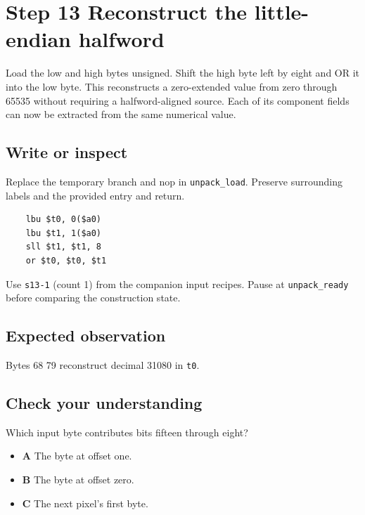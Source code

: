 \section{Step 13 Reconstruct the little-endian halfword}\label{rgb-s13}

Load the low and high bytes unsigned. Shift the high byte left by eight and OR it into the low byte. This reconstructs a zero-extended value from zero through 65535 without requiring a halfword-aligned source. Each of its component fields can now be extracted from the same numerical value.

\subsection{Write or inspect}
Replace the temporary branch and nop in \texttt{unpack\_load}. Preserve surrounding labels and the provided entry and return.

\begin{verbatim}
    lbu $t0, 0($a0)
    lbu $t1, 1($a0)
    sll $t1, $t1, 8
    or $t0, $t0, $t1
\end{verbatim}
Use \texttt{s13-1} (count 1) from the companion input recipes. Pause at \texttt{unpack\_ready} before comparing the construction state.

\subsection{Expected observation}
Bytes 68 79 reconstruct decimal 31080 in \texttt{t0}.

\subsection{Check your understanding}
Which input byte contributes bits fifteen through eight?

\begin{itemize}
  \item \textbf{A} The byte at offset one.
  \item \textbf{B} The byte at offset zero.
  \item \textbf{C} The next pixel's first byte.
\end{itemize}
